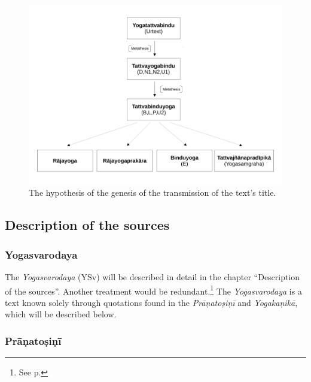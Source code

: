  \begin{figure}[h!]
    \centering
    \includegraphics[width=1\textwidth]{pics/titel-hypothese.pdf} %
    \caption{The hypothesis of the genesis of the transmission of the text's title.}
    \label{fig:titel-hypothese}
\end{figure}

\subsection{Description of the sources}

\subsubsection{Yogasvarodaya}

The \emph{Yogasvarodaya} (YSv) will be described in detail in the chapter ``Description of the sources''. Another treatment would be redundant.\footnote{See p. \pageref{yogasvarodayadescription}} The \emph{Yogasvarodaya} is a text known solely through quotations found in the \emph{Prāṇatoṣiṇī} and \emph{Yogakaṇikā}, which will be described below.

\subsubsection{Prāṇatoṣiṇī}


